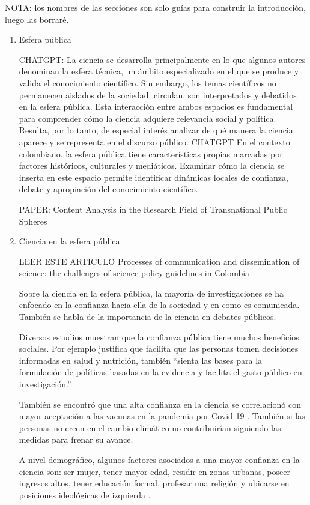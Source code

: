 \documentclass[11pt,a4paper]{article}
\begin{document}
	NOTA: los nombres de las secciones son solo guías para construir la introducción, luego las borraré.
	\begin{enumerate}
		\item Esfera pública
				
		CHATGPT: La ciencia se desarrolla principalmente en lo que algunos autores denominan la esfera técnica, un ámbito especializado en el que se produce y valida el conocimiento científico. Sin embargo, los temas científicos no permanecen aislados de la sociedad: circulan, son interpretados y debatidos en la esfera pública. Esta interacción entre ambos espacios es fundamental para comprender cómo la ciencia adquiere relevancia social y política. Resulta, por lo tanto, de especial interés analizar de qué manera la ciencia aparece y se representa en el discurso público.
		CHATGPT 
		En el contexto colombiano, la esfera pública tiene características propias marcadas por factores históricos, culturales y mediáticos. Examinar cómo la ciencia se inserta en este espacio permite identificar dinámicas locales de confianza, debate y apropiación del conocimiento científico.
		
		PAPER: Content Analysis in the Research Field of Transnational Public Spheres
		
			
		\item Ciencia en la esfera pública
		
		LEER ESTE ARTICULO Processes of communication and dissemination of science: the challenges of science policy guidelines in Colombia
		
		Sobre la ciencia en la esfera pública, la mayoría de investigaciones se ha enfocado en la confianza hacia ella de la sociedad y en como es comunicada. También se habla de la importancia de la ciencia en debates públicos.
		
		Diversos estudios muestran que la confianza pública tiene muchos beneficios sociales. Por ejemplo \cite{Cologna2025} justifica que facilita que las personas tomen decisiones informadas en salud y nutrición, también ``sienta las bases para la formulación de políticas basadas en la evidencia y facilita el gasto público en investigación.'' 
		
		También se encontró que una alta confianza en la ciencia se correlacionó con mayor aceptación a las vacunas en la pandemia por Covid-19 \cite{Sturgis2021}. También si las personas no creen en el cambio climático no contribuirían siguiendo las medidas para frenar su avance.
		
		A nivel demográfico, algunos factores asociados a una mayor confianza en la ciencia son: ser mujer, tener mayor edad, residir en zonas urbanas, poseer ingresos altos, tener educación formal, profesar una religión y ubicarse en posiciones ideológicas de izquierda \cite{Cologna2025}.
		

\end{enumerate}
\end{document}

